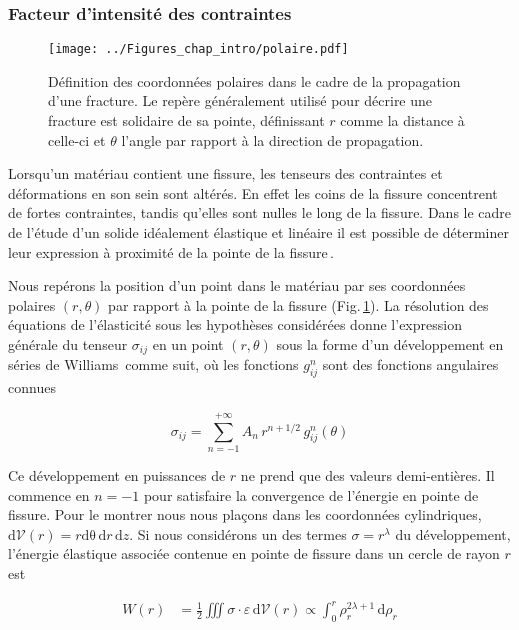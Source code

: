 \subsubsection{Facteur d'intensité des contraintes}
\begin{figure}[htb]
\centering
\texttt{[image: ../Figures\_chap\_intro/polaire.pdf]}
\caption[Coordonnées polaires]{Définition des coordonnées polaires dans le cadre de la propagation d'une fracture. Le repère généralement utilisé pour décrire une fracture est solidaire de sa pointe, définissant $r$ comme la distance à celle-ci et $\theta$ l'angle par rapport à la direction de propagation.}
\label{fig:polaire}
\end{figure}


Lorsqu'un matériau contient une fissure, les tenseurs des contraintes et déformations en son sein sont altérés. En effet les coins de la fissure concentrent de fortes contraintes, tandis qu'elles sont nulles le long de la fissure. Dans le cadre de l'étude d'un solide idéalement élastique et linéaire il est possible de déterminer leur expression à proximité de la pointe de la fissure\,\cite{irwin_analysis_1957,williams_stress_1957,erdogan_fracture_2000,sun_fracture_2012}.


Nous repérons la position d'un point dans le matériau par ses coordonnées polaires $(r,\theta)$ par rapport à la pointe de la fissure (Fig.\,\ref{fig:polaire}). La résolution des équations de l'élasticité sous les hypothèses considérées donne l'expression générale du tenseur $\sigma_{ij}$ en un point $(r,\theta)$ sous la forme d'un développement en séries de Williams\,\cite{williams_stress_1957} comme suit, où les fonctions $g_{ij}^n$ sont des fonctions angulaires connues

\begin{equation}
\sigma_{ij}=\sum_{n=-1}^{+\infty} A_n\,r^{n+1/2}\,g^n_{ij}(\theta)
\end{equation}

Ce développement en puissances de $r$ ne prend que des valeurs demi-entières. Il commence en $n=-1$ pour satisfaire la convergence de l'énergie en pointe de fissure. Pour le montrer nous nous plaçons dans les coordonnées cylindriques, $\mathrm{d}\mathcal{V}(r)=r\mathrm{d\theta}\,\mathrm{d}r\,\mathrm{d}z$. Si nous considérons un des termes $\sigma = r^{\lambda}$ du développement, l'énergie élastique associée contenue en pointe de fissure dans un cercle de rayon $r$ est

\begin{equation}
\begin{aligned}
W(r)&=\frac{1}{2}\iiint\sigma\cdot\varepsilon\,\mathrm{d}\mathcal{V}(r)\propto \int_{0}^r \rho_r^{2\lambda+1}\,\mathrm{d}\rho_r
\end{aligned}
\end{equation}

